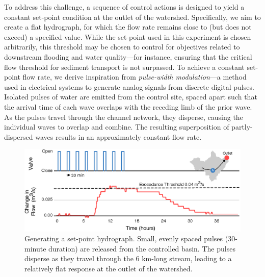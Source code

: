 To address this challenge, a sequence of control actions is designed to yield a constant set-point condition at the outlet of the watershed. Specifically, we aim to create a flat hydrograph, for which the flow rate remains close to (but does not exceed) a specified value. While the set-point used in this experiment is chosen arbitrarily, this threshold may be chosen to control for objectives related to downstream flooding and water quality---for instance, ensuring that the critical flow threshold for sediment transport is not surpassed.
To achieve a constant set-point flow rate, we derive inspiration from \textit{pulse-width modulation}---a method used in electrical systems to generate analog signals from discrete digital pulses. Isolated pulses of water are emitted from the control site, spaced apart such that the arrival time of each wave overlaps with the receding limb of the prior wave. As the pulses travel through the channel network, they disperse, causing the individual waves to overlap and combine. The resulting superposition of partly-dispersed waves results in an approximately constant flow rate.

\begin{figure}[H]
    \centering
    \includegraphics[width=\textwidth]{gfx/Chapter-2/Figure7.eps}
    \caption{Generating a set-point hydrograph. Small, evenly spaced pulses (30-minute duration) are released from the controlled basin. The pulses disperse as they travel through the 6 km-long stream, leading to a relatively flat response at the outlet of the watershed.}\label{fig-ch2:5}
\end{figure}

